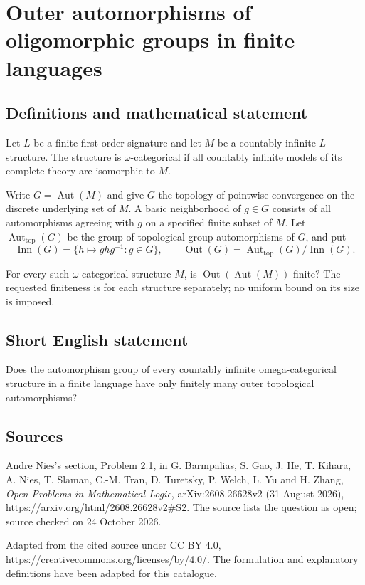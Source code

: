 \documentclass{article}
\begin{document}
\section*{Outer automorphisms of oligomorphic groups in finite languages}
\subsection{Definitions and mathematical statement}

Let $L$ be a finite first-order signature and let $M$ be a countably infinite
$L$-structure. The structure is $\omega$-categorical if all countably infinite
models of its complete theory are isomorphic to $M$.

Write $G=\operatorname{Aut}(M)$ and give $G$ the topology of pointwise
convergence on the discrete underlying set of $M$. A basic neighborhood of
$g\in G$ consists of all automorphisms agreeing with $g$ on a specified finite
subset of $M$. Let $\operatorname{Aut}_{\mathrm{top}}(G)$ be the group of
topological group automorphisms of $G$, and put
\[
 \operatorname{Inn}(G)=\{h\mapsto ghg^{-1}:g\in G\},\qquad
 \operatorname{Out}(G)=\operatorname{Aut}_{\mathrm{top}}(G)/\operatorname{Inn}(G).
\]

For every such $\omega$-categorical structure $M$, is
$\operatorname{Out}(\operatorname{Aut}(M))$ finite?
The requested finiteness is for each structure separately; no uniform bound
on its size is imposed.

\subsection{Short English statement}
Does the automorphism group of every countably infinite omega-categorical
structure in a finite language have only finitely many outer topological
automorphisms?

\subsection{Sources}
Andre Nies's section, Problem 2.1, in G. Barmpalias, S. Gao, J. He, T. Kihara,
A. Nies, T. Slaman, C.-M. Tran, D. Turetsky, P. Welch, L. Yu and H. Zhang,
\emph{Open Problems in Mathematical Logic}, arXiv:2608.26628v2 (31 August 2026),
\url{https://arxiv.org/html/2608.26628v2#S2}.
The source lists the question as open; source checked on 24 October 2026.

Adapted from the cited source under CC BY 4.0,
\url{https://creativecommons.org/licenses/by/4.0/}. The formulation and explanatory definitions have been adapted for this catalogue.
\end{document}

